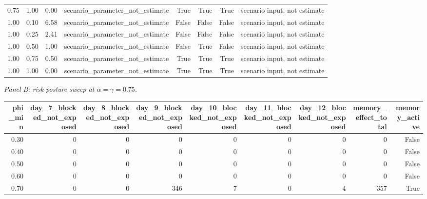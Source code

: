 \begin{table}
\begin{tabular}{rrrlrrrl}
0.75 & 1.00 & 0.00 & scenario\_parameter\_not\_estimate & True & True & True & scenario input, not estimate \\
1.00 & 0.10 & 6.58 & scenario\_parameter\_not\_estimate & False & False & False & scenario input, not estimate \\
1.00 & 0.25 & 2.41 & scenario\_parameter\_not\_estimate & False & False & False & scenario input, not estimate \\
1.00 & 0.50 & 1.00 & scenario\_parameter\_not\_estimate & False & True & False & scenario input, not estimate \\
1.00 & 0.75 & 0.50 & scenario\_parameter\_not\_estimate & True & True & True & scenario input, not estimate \\
1.00 & 1.00 & 0.00 & scenario\_parameter\_not\_estimate & True & True & True & scenario input, not estimate \\
\bottomrule
\end{tabular}

\textit{Panel B: risk-posture sweep at $\alpha=\gamma=0.75$.}\par
\begin{tabular}{rrrrrrrrr}
\toprule
phi\_min & day\_7\_blocked\_not\_exposed & day\_8\_blocked\_not\_exposed & day\_9\_blocked\_not\_exposed & day\_10\_blocked\_not\_exposed & day\_11\_blocked\_not\_exposed & day\_12\_blocked\_not\_exposed & memory\_effect\_total & memory\_active \\
\midrule
0.30 & 0 & 0 & 0 & 0 & 0 & 0 & 0 & False \\
0.40 & 0 & 0 & 0 & 0 & 0 & 0 & 0 & False \\
0.50 & 0 & 0 & 0 & 0 & 0 & 0 & 0 & False \\
0.60 & 0 & 0 & 0 & 0 & 0 & 0 & 0 & False \\
0.70 & 0 & 0 & 346 & 7 & 0 & 4 & 357 & True \\
\bottomrule
\end{tabular}

\end{table}
